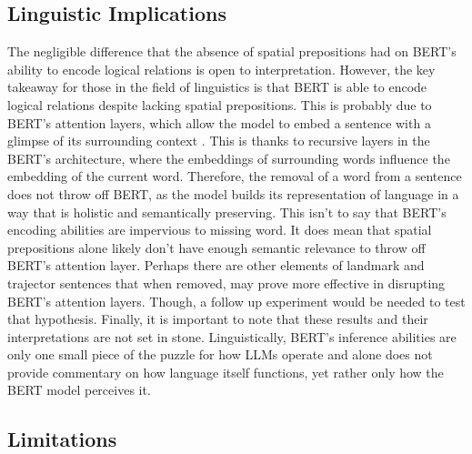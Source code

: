 \documentclass[12pt,letterpaper]{article}
\begin{document}
\subsection{Linguistic Implications}
The negligible difference that the absence of spatial prepositions had on BERT's ability to encode logical relations is open to interpretation. However, the key takeaway for those in the field of linguistics is that BERT is able to encode logical relations despite lacking spatial prepositions. This is probably due to BERT's attention layers, which allow the model to embed a sentence with a glimpse of its surrounding context \citep{vaswani_attention_2017}. This is thanks to recursive layers in the BERT's architecture, where the embeddings of surrounding words influence the embedding of the current word. Therefore, the removal of a word from a sentence does not throw off BERT, as the model builds its representation of language in a way that is holistic and semantically preserving. This isn't to say that BERT's encoding abilities are impervious to missing word. It does mean that spatial prepositions alone likely don't have enough semantic relevance to throw off BERT's attention layer. Perhaps there are other elements of landmark and trajector sentences that when removed, may prove more effective in disrupting BERT's attention layers. Though, a follow up experiment would be needed to test that hypothesis. Finally, it is important to note that these results and their interpretations are not set in stone. Linguistically, BERT's inference abilities are only one small piece of the puzzle for how LLMs operate and alone does not provide commentary on how language itself functions, yet rather only how the BERT model perceives it.  



\subsection{Limitations}
\end{document}
